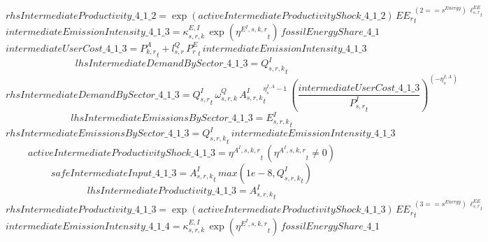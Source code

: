 \begin{dmath*}
rhsIntermediateProductivity\_4\_1\_2 = \exp\left({activeIntermediateProductivityShock\_4\_1\_2}\right)\, {{EE_r}}_{t}^{\left(2=={{s^{Energy}}}\right)\, {{\ell^{EE}_{s,r}}}_{t}}
\end{dmath*}
\begin{dmath*}
intermediateEmissionIntensity\_4\_1\_3 = {{\kappa^{E,I}_{s,r,k}}}\, \exp\left({{\eta^{E^{I},s,k,r}}}_{t}\right)\, {fossilEnergyShare\_4\_1}
\end{dmath*}
\begin{dmath*}
intermediateUserCost\_4\_1\_3 = {{P^{A}_{k,r}}}_{t}+{{l^{Q}_{s,r}}}\, {{P^E_r}}_{t}\, {intermediateEmissionIntensity\_4\_1\_3}
\end{dmath*}
\begin{dmath*}
lhsIntermediateDemandBySector\_4\_1\_3 = {{Q^{I}_{s,r,k}}}_{t}
\end{dmath*}
\begin{dmath*}
rhsIntermediateDemandBySector\_4\_1\_3 = {{Q^{I}_{s,r}}}_{t}\, {{\omega^{Q}_{s,r,k}}}\, {{A^{I}_{s,r,k}}}_{t}^{{{\eta^{I,A}_{s}}}-1}\, \left(\frac{{intermediateUserCost\_4\_1\_3}}{{{P^{I}_{s,r}}}_{t}}\right)^{\left(-{{\eta^{I,A}_{s}}}\right)}
\end{dmath*}
\begin{dmath*}
lhsIntermediateEmissionsBySector\_4\_1\_3 = {{E^I_{s,r,k}}}_{t}
\end{dmath*}
\begin{dmath*}
rhsIntermediateEmissionsBySector\_4\_1\_3 = {{Q^{I}_{s,r,k}}}_{t}\, {intermediateEmissionIntensity\_4\_1\_3}
\end{dmath*}
\begin{dmath*}
activeIntermediateProductivityShock\_4\_1\_3 = {{\eta^{A^{I},s,k,r}}}_{t}\, \left({{\eta^{A^{I},s,k,r}}}_{t}\neq 0\right)
\end{dmath*}
\begin{dmath*}
safeIntermediateInput\_4\_1\_3 = {{A^{I}_{s,r,k}}}_{t}\, max(1e-8,{{Q^{I}_{s,r,k}}}_{t})
\end{dmath*}
\begin{dmath*}
lhsIntermediateProductivity\_4\_1\_3 = {{A^{I}_{s,r,k}}}_{t}
\end{dmath*}
\begin{dmath*}
rhsIntermediateProductivity\_4\_1\_3 = \exp\left({activeIntermediateProductivityShock\_4\_1\_3}\right)\, {{EE_r}}_{t}^{\left(3=={{s^{Energy}}}\right)\, {{\ell^{EE}_{s,r}}}_{t}}
\end{dmath*}
\begin{dmath*}
intermediateEmissionIntensity\_4\_1\_4 = {{\kappa^{E,I}_{s,r,k}}}\, \exp\left({{\eta^{E^{I},s,k,r}}}_{t}\right)\, {fossilEnergyShare\_4\_1}
\end{dmath*}
